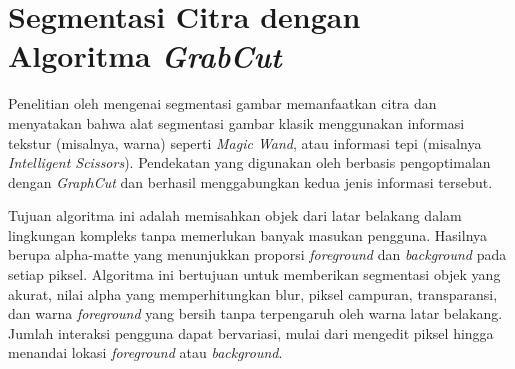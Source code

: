 \section{Segmentasi Citra dengan Algoritma \emph{GrabCut}}



Penelitian oleh \cite{Rother:2004} mengenai segmentasi gambar memanfaatkan citra 
dan menyatakan bahwa alat segmentasi gambar klasik menggunakan informasi tekstur 
(misalnya, warna) seperti \emph{Magic Wand}, atau informasi tepi (misalnya 
\emph{Intelligent Scissors}). Pendekatan yang digunakan oleh \cite{Rother:2004} 
berbasis pengoptimalan dengan \emph{GraphCut} dan berhasil menggabungkan kedua jenis 
informasi tersebut.

Tujuan algoritma ini adalah memisahkan objek dari latar belakang dalam lingkungan 
kompleks tanpa memerlukan banyak masukan pengguna. Hasilnya berupa alpha-matte yang 
menunjukkan proporsi \emph{foreground} dan \emph{background} pada setiap piksel. Algoritma ini 
bertujuan untuk memberikan segmentasi objek yang akurat, nilai alpha yang memperhitungkan 
blur, piksel campuran, transparansi, dan warna \emph{foreground} yang bersih tanpa 
terpengaruh oleh warna latar belakang. Jumlah interaksi pengguna dapat bervariasi, 
mulai dari mengedit piksel hingga menandai lokasi \emph{foreground} atau \emph{background}.

